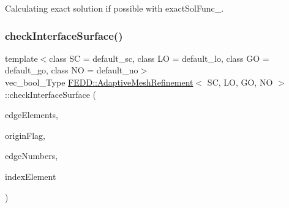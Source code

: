 Calculating exact solution if possible with exact\+Sol\+Func\+\_\+. 

\mbox{\label{classFEDD_1_1AdaptiveMeshRefinement_a35ec26c4ed6ccbf878ce35cf86a6b455}} 
\subsubsection{\texorpdfstring{check\+Interface\+Surface()}{checkInterfaceSurface()}}
{\footnotesize\ttfamily template$<$class SC = default\+\_\+sc, class LO = default\+\_\+lo, class GO = default\+\_\+go, class NO = default\+\_\+no$>$ \\
vec\+\_\+bool\+\_\+\+Type \hyperlink{classFEDD_1_1AdaptiveMeshRefinement}{F\+E\+D\+D\+::\+Adaptive\+Mesh\+Refinement}$<$ SC, LO, GO, NO $>$\+::check\+Interface\+Surface (\begin{DoxyParamCaption}\item[{\hyperlink{classFEDD_1_1AdaptiveMeshRefinement_a495f60e86da92289b7fe1c15e291660d}{Edge\+Elements\+Ptr\+\_\+\+Type}}]{edge\+Elements,  }\item[{vec\+\_\+int\+\_\+\+Type}]{origin\+Flag,  }\item[{vec\+\_\+int\+\_\+\+Type}]{edge\+Numbers,  }\item[{int}]{index\+Element }\end{DoxyParamCaption})}

\mbox{\label{classFEDD_1_1AdaptiveMeshRefinement_ac428fd84d745170b6b83c5f3ec07fead}} 

